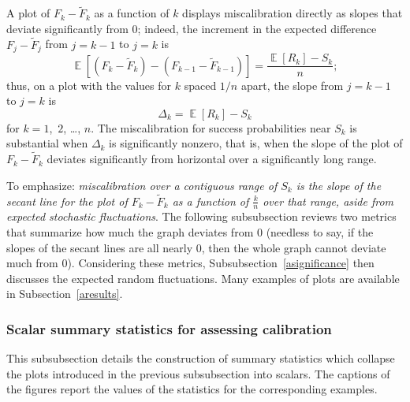 \documentclass{article}
\DeclareMathOperator{\E}{\mathop{}\mathbb{E}}
\begin{document}
A plot of $F_k-\tilde{F}_k$ as a function of $k$ displays miscalibration
directly as slopes that deviate significantly from 0;
indeed, the increment in the expected difference $F_j-\tilde{F}_j$
from $j = k-1$ to $j = k$ is
%
\begin{equation}
\E[ (F_k-\tilde{F}_k) - (F_{k-1}-\tilde{F}_{k-1}) ]
= \frac{\E[ R_k ] - S_k}{n};
\end{equation}
%
thus, on a plot with the values for $k$ spaced $1/n$ apart,
the slope from $j = k-1$ to $j = k$ is
%
\begin{equation}
\label{adelta}
\Delta_k = \E[ R_k ] - S_k
\end{equation}
%
for $k = 1$,~$2$, \dots, $n$.
The miscalibration for success probabilities near $S_k$ is substantial
when $\Delta_k$ is significantly nonzero, that is, when the slope
of the plot of $F_k-\tilde{F}_k$ deviates significantly from horizontal
over a significantly long range.

To emphasize: {\it miscalibration over a contiguous range of $S_k$
is the slope of the secant line for the plot of $F_k-\tilde{F}_k$
as a function of $\frac{k}{n}$ over that range,
aside from expected stochastic fluctuations}.
The following subsubsection reviews two metrics that summarize
how much the graph deviates from 0 (needless to say,
if the slopes of the secant lines are all nearly 0,
then the whole graph cannot deviate much from 0).
Considering these metrics, Subsubsection~\ref{asignificance} then discusses
the expected random fluctuations.
Many examples of plots are available in Subsection~\ref{aresults}.


\subsubsection{Scalar summary statistics for assessing calibration}
\label{ascalarstats}

This subsubsection details the construction of summary statistics
which collapse the plots introduced in the previous subsubsection
into scalars. The captions of the figures report the values of the statistics
for the corresponding examples.
\end{document}
